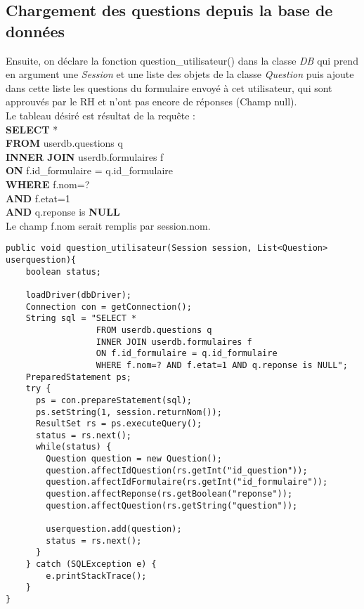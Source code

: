 \documentclass[12]{article}
\begin{document}
\subsection{Chargement des questions depuis la base de données}

Ensuite, on déclare la fonction question\_utilisateur() dans la classe \textit{DB} qui prend en argument une \textit{Session} et une liste des objets de la classe \textit{Question} puis ajoute dans cette liste les questions du formulaire envoyé à cet utilisateur, qui sont approuvés par le RH et n'ont pas encore de réponses (Champ null).\\


Le tableau désiré est résultat de la requête :\\
\textbf{SELECT} * \\
\textbf{FROM} userdb.questions q \\
\textbf{INNER JOIN} userdb.formulaires f \\
\textbf{ON} f.id\_formulaire = q.id\_formulaire\\
\textbf{WHERE} f.nom=? \\
\textbf{AND} f.etat=1\\
\textbf{AND} q.reponse is \textbf{NULL} \\

Le champ f.nom serait remplis par session.nom.



\begin{small}
\lstset{language=java}
\begin{lstlisting}
public void question_utilisateur(Session session, List<Question> userquestion){
	boolean status;

	loadDriver(dbDriver);
	Connection con = getConnection();
	String sql = "SELECT * 
				  FROM userdb.questions q 
				  INNER JOIN userdb.formulaires f 
				  ON f.id_formulaire = q.id_formulaire 
				  WHERE f.nom=? AND f.etat=1 AND q.reponse is NULL";
	PreparedStatement ps;
	try {
	  ps = con.prepareStatement(sql);
	  ps.setString(1, session.returnNom());
	  ResultSet rs = ps.executeQuery();
	  status = rs.next();
	  while(status) {
		Question question = new Question();
		question.affectIdQuestion(rs.getInt("id_question"));
		question.affectIdFormulaire(rs.getInt("id_formulaire"));
		question.affectReponse(rs.getBoolean("reponse"));
		question.affectQuestion(rs.getString("question"));

		userquestion.add(question);
		status = rs.next();
	  }
	} catch (SQLException e) {
		e.printStackTrace();
	}
}
\end{lstlisting}

\end{small}
\end{document}
